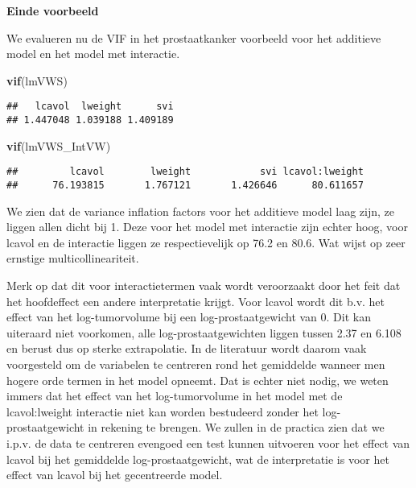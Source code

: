 \documentclass[12pt,dutch,coursenotes]{book}
\newenvironment{Shaded}{\begin{snugshade}}{\end{snugshade}}
\newcommand{\KeywordTok}[1]{\textcolor[rgb]{0.13,0.29,0.53}{\textbf{#1}}}
\newcommand{\NormalTok}[1]{#1}
\theoremstyle{definition}
\theoremstyle{definition}
\theoremstyle{definition}
\theoremstyle{remark}
\begin{document}
\textbf{Einde voorbeeld}

We evalueren nu de VIF in het prostaatkanker voorbeeld voor het
additieve model en het model met interactie.

\begin{Shaded}
\begin{Highlighting}[]
\KeywordTok{vif}\NormalTok{(lmVWS)}
\end{Highlighting}
\end{Shaded}

\begin{verbatim}
##   lcavol  lweight      svi 
## 1.447048 1.039188 1.409189
\end{verbatim}

\begin{Shaded}
\begin{Highlighting}[]
\KeywordTok{vif}\NormalTok{(lmVWS_IntVW)}
\end{Highlighting}
\end{Shaded}

\begin{verbatim}
##         lcavol        lweight            svi lcavol:lweight 
##      76.193815       1.767121       1.426646      80.611657
\end{verbatim}

We zien dat de variance inflation factors voor het additieve model laag
zijn, ze liggen allen dicht bij 1. Deze voor het model met interactie
zijn echter hoog, voor lcavol en de interactie liggen ze respectievelijk
op 76.2 en 80.6. Wat wijst op zeer ernstige multicollineariteit.

Merk op dat dit voor interactietermen vaak wordt veroorzaakt door het
feit dat het hoofdeffect een andere interpretatie krijgt. Voor lcavol
wordt dit b.v. het effect van het log-tumorvolume bij een
log-prostaatgewicht van 0. Dit kan uiteraard niet voorkomen, alle
log-prostaatgewichten liggen tussen 2.37 en 6.108 en berust dus op
sterke extrapolatie. In de literatuur wordt daarom vaak voorgesteld om
de variabelen te centreren rond het gemiddelde wanneer men hogere orde
termen in het model opneemt. Dat is echter niet nodig, we weten immers
dat het effect van het log-tumorvolume in het model met de
lcavol:lweight interactie niet kan worden bestudeerd zonder het
log-prostaatgewicht in rekening te brengen. We zullen in de practica
zien dat we i.p.v. de data te centreren evengoed een test kunnen
uitvoeren voor het effect van lcavol bij het gemiddelde
log-prostaatgewicht, wat de interpretatie is voor het effect van lcavol
bij het gecentreerde model.
\end{document}

